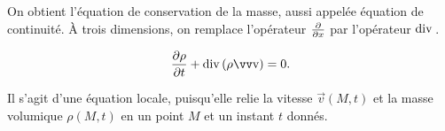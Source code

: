 \documentclass[12pt,fancy]{cours}
\begin{document}
On obtient l'équation de conservation de la masse, aussi appelée équation de continuité. À trois dimensions, on remplace l'opérateur $\frac{\partial{}}{\partial{x}}$ par l'opérateur ${\rm {div}\,}{}$.
\begin{theorem}\label{form:conserv_m}
\begin{equation*}
\dfrac{\partial \rho}{\partial t}+\Dive{(\rho \Vec{v})}=0.
\end{equation*}
\end{theorem}
\noindent Il s'agit d'une équation locale, puisqu'elle relie la vitesse $\Vec{v}(M,t)$ et la masse volumique $\rho(M,t)$ en un point $M$ et un instant $t$ donnés.

\end{document}

